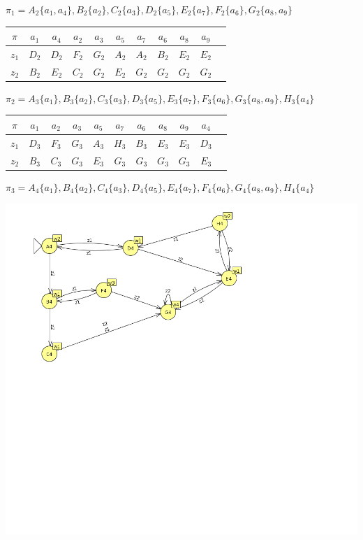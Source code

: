 $\pi_1 = A_2 \{a_1, a_4\}, B_2 \{a_2\}, C_2 \{a_3\}, D_2 \{a_5\}, E_2 \{a_7\}, F_2 \{a_6\}, G_2 \{a_8, a_9\}$

\begin{table}[!h]
\begin{tabular}{|c|c|c|c|c|c|c|c|c|c|c|}
\hline
$\pi$     & $a_1$ & $a_4$ & $a_2$ & $a_3$ & $a_5$ & $a_7$ & $a_6$ & $a_8$ & $a_9$ \\ \hline
$z_1$     & $D_2$ & $D_2$ & $F_2$ & $G_2$ & $A_2$ & $A_2$ & $B_2$ & $E_2$ & $E_2$ \\ \hline
$z_2$     & $B_2$ & $E_2$ & $C_2$ & $G_2$ & $E_2$ & $G_2$ & $G_2$ & $G_2$ & $G_2$ \\ \hline
\end{tabular}
\end{table}

$\pi_2 = A_3 \{a_1\}, B_3 \{a_2\}, C_3 \{a_3\}, D_3 \{a_5\}, E_3 \{a_7\}, F_3 \{a_6\}, G_3 \{a_8, a_9\}, H_3 \{a_4\}$

\begin{table}[!h]
\begin{tabular}{|c|c|c|c|c|c|c|c|c|c|c|}
\hline
$\pi$     & $a_1$ & $a_2$ & $a_3$ & $a_5$ & $a_7$ & $a_6$ & $a_8$ & $a_9$ & $a_4$ \\ \hline
$z_1$     & $D_3$ & $F_3$ & $G_3$ & $A_3$ & $H_3$ & $B_3$ & $E_3$ & $E_3$ & $D_3$ \\ \hline
$z_2$     & $B_3$ & $C_3$ & $G_3$ & $E_3$ & $G_3$ & $G_3$ & $G_3$ & $G_3$ & $E_3$ \\ \hline
\end{tabular}
\end{table}

$\pi_3 = A_4 \{a_1\}, B_4 \{a_2\}, C_4 \{a_3\}, D_4 \{a_5\}, E_4 \{a_7\}, F_4 \{a_6\}, G_4 \{a_8, a_9\}, H_4 \{a_4\}$

\includegraphics[width=400bp]{img/second.png}

